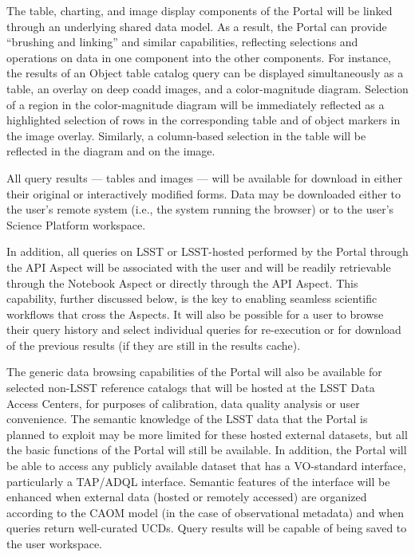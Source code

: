 The table, charting, and image display components of the Portal will be linked through an underlying shared data model.
As a result, the Portal can provide ``brushing and linking'' and similar capabilities, reflecting selections and operations on data in one component into the other components.
For instance, the results of an Object table catalog query can be displayed simultaneously as a table, an overlay on deep coadd images, and a color-magnitude diagram.
Selection of a region in the color-magnitude diagram will be immediately reflected as a highlighted selection of rows in the corresponding table and of object markers in the image overlay.
Similarly, a column-based selection in the table will be reflected in the diagram and on the image.

All query results --- tables and images --- will be available for download in either their original or interactively modified forms.
Data may be downloaded either to the user's remote system (i.e., the system running the browser) or to the user's Science Platform workspace.

In addition, all queries on LSST or LSST-hosted performed by the Portal through the API Aspect will be associated with the user and will be readily retrievable through the Notebook Aspect or directly through the API Aspect.
This capability, further discussed below, is the key to enabling seamless scientific workflows that cross the Aspects.
It will also be possible for a user to browse their query history and select individual queries for re-execution or for download of the previous results (if they are still in the results cache).

The generic data browsing capabilities of the Portal will also be available for selected non-LSST reference catalogs that will be hosted at the LSST Data Access Centers, for purposes of calibration, data quality analysis or user convenience.
The semantic knowledge of the LSST data that the Portal is planned to exploit may be more limited for these hosted external datasets, but all the basic functions of the Portal will still be available.
In addition, the Portal will be able to access any publicly available dataset that has a VO-standard interface, particularly a TAP/ADQL interface.
Semantic features of the interface will be enhanced when external data (hosted or remotely accessed) are organized according to the CAOM model (in the case of observational metadata) and when queries return well-curated UCDs.
Query results will be capable of being saved to the user workspace.


